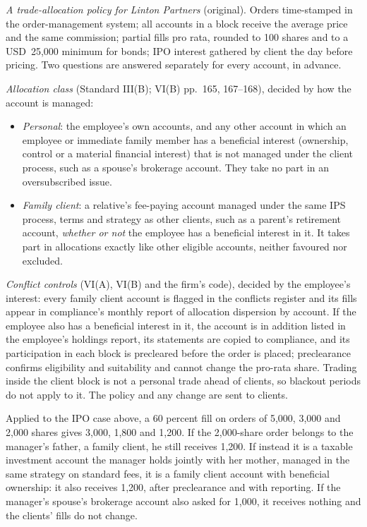 \begin{qfmethod}
 \emph{A trade-allocation policy for Linton Partners} (original). Orders time-stamped in the order-management system; all accounts in a block receive the average price and the same commission; partial fills pro rata, rounded to 100 shares and to a USD~25,000 minimum for bonds; IPO interest gathered by client the day before pricing. Two questions are answered separately for every account, in advance.

\emph{Allocation class} (Standard III(B); VI(B) pp.~165, 167--168), decided by how the account is managed:
\begin{itemize}
\item \emph{Personal}: the employee's own accounts, and any other account in which an employee or immediate family member has a beneficial interest (ownership, control or a material financial interest) that is not managed under the client process, such as a spouse's brokerage account. They take no part in an oversubscribed issue.
\item \emph{Family client}: a relative's fee-paying account managed under the same IPS process, terms and strategy as other clients, such as a parent's retirement account, \emph{whether or not} the employee has a beneficial interest in it. It takes part in allocations exactly like other eligible accounts, neither favoured nor excluded.
\end{itemize}
\emph{Conflict controls} (VI(A), VI(B) and the firm's code), decided by the employee's interest: every family client account is flagged in the conflicts register and its fills appear in compliance's monthly report of allocation dispersion by account. If the employee also has a beneficial interest in it, the account is in addition listed in the employee's holdings report, its statements are copied to compliance, and its participation in each block is precleared before the order is placed; preclearance confirms eligibility and suitability and cannot change the pro-rata share. Trading inside the client block is not a personal trade ahead of clients, so blackout periods do not apply to it. The policy and any change are sent to clients.

Applied to the IPO case above, a 60 percent fill on orders of 5,000, 3,000 and 2,000 shares gives 3,000, 1,800 and 1,200. If the 2,000-share order belongs to the manager's father, a family client, he still receives 1,200. If instead it is a taxable investment account the manager holds jointly with her mother, managed in the same strategy on standard fees, it is a family client account with beneficial ownership: it also receives 1,200, after preclearance and with reporting. If the manager's spouse's brokerage account also asked for 1,000, it receives nothing and the clients' fills do not change.


\end{qfmethod}
